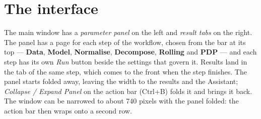 \documentclass[11pt]{report}
\newcommand{\tab}[1]{\textbf{#1}}
\begin{document}
\chapter{The interface}\label{ch:ui}

The main window has a \emph{parameter panel} on the left and \emph{result tabs} on the
right. The panel has a page for each step of the workflow, chosen from the bar at its top
--- \tab{Data}, \tab{Model}, \tab{Normalise}, \tab{Decompose}, \tab{Rolling} and
\tab{PDP} --- and each step has its own \emph{Run} button beside the settings that govern
it. Results
land in the tab of the same step, which comes to the front when the step finishes. The
panel starts folded away, leaving the width to the results and the Assistant;
\emph{Collapse / Expand Panel} on the action bar (Ctrl+B) folds it and brings it back. The
window can be narrowed to about 740 pixels with the panel folded: the action bar then
wraps onto a second row.
\end{document}
